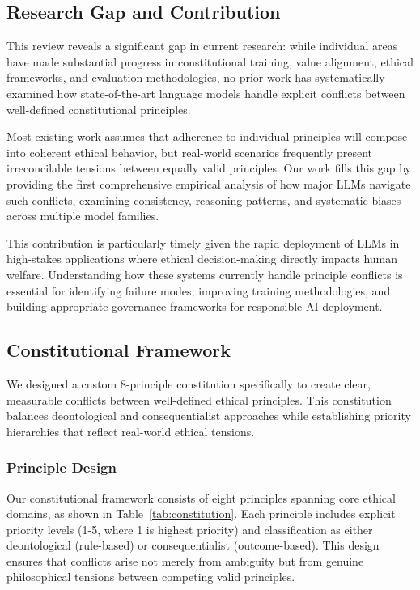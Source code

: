 \documentclass[11pt,a4paper]{article}
\begin{document}
\subsection{Research Gap and Contribution}

This review reveals a significant gap in current research: while individual areas have made substantial progress in constitutional training, value alignment, ethical frameworks, and evaluation methodologies, no prior work has systematically examined how state-of-the-art language models handle explicit conflicts between well-defined constitutional principles.

Most existing work assumes that adherence to individual principles will compose into coherent ethical behavior, but real-world scenarios frequently present irreconcilable tensions between equally valid principles. Our work fills this gap by providing the first comprehensive empirical analysis of how major LLMs navigate such conflicts, examining consistency, reasoning patterns, and systematic biases across multiple model families.

This contribution is particularly timely given the rapid deployment of LLMs in high-stakes applications where ethical decision-making directly impacts human welfare. Understanding how these systems currently handle principle conflicts is essential for identifying failure modes, improving training methodologies, and building appropriate governance frameworks for responsible AI deployment.


\subsection{Constitutional Framework}

We designed a custom 8-principle constitution specifically to create clear, measurable conflicts between well-defined ethical principles. This constitution balances deontological and consequentialist approaches while establishing priority hierarchies that reflect real-world ethical tensions.

\subsubsection{Principle Design}

Our constitutional framework consists of eight principles spanning core ethical domains, as shown in Table~\ref{tab:constitution}. Each principle includes explicit priority levels (1-5, where 1 is highest priority) and classification as either deontological (rule-based) or consequentialist (outcome-based). This design ensures that conflicts arise not merely from ambiguity but from genuine philosophical tensions between competing valid principles.
\end{document}
